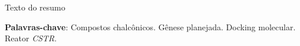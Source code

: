 




\begin{resumo}

Texto do resumo

\noindent
\textbf{Palavras-chave}: Compostos chalcônicos. Gênese planejada. Docking molecular. Reator \textit{CSTR}.

\end{resumo}





